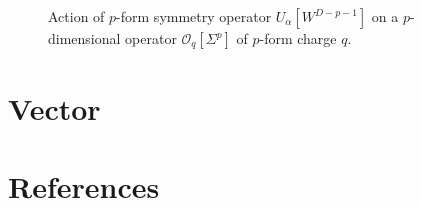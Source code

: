 \documentclass[
  letterpaper,
  DIV=11,
  numbers=noendperiod]{scrreport}
\begin{document}
\begin{figure}

\begin{minipage}[t]{0.50\linewidth}

{\centering 


}

\end{minipage}%
%
\begin{minipage}[t]{0.50\linewidth}

{\centering 


}

\end{minipage}%

\caption{\label{fig-one-form}Action of \(p\)-form symmetry operator
\(U_\alpha[W^{D-p-1}]\) on a \(p\)-dimensional operator
\(\mathcal{O}_q[\Sigma^p]\) of \(p\)-form charge \(q\).}

\end{figure}


\hypertarget{sec-vector}{%
\chapter{Vector}\label{sec-vector}}


\hypertarget{references}{%
\chapter*{References}\label{references}}


\printbibliography[heading=none]
\end{document}
